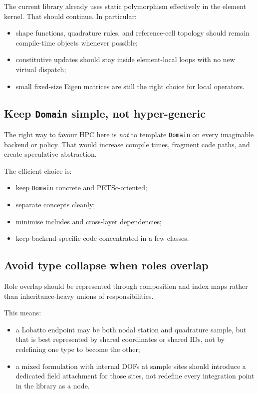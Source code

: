The current library already uses static polymorphism effectively in the element
kernel.  That should continue.  In particular:

\begin{itemize}[nosep]
  \item shape functions, quadrature rules, and reference-cell topology should
        remain compile-time objects whenever possible;
  \item constitutive updates should stay inside element-local loops with no new
        virtual dispatch;
  \item small fixed-size Eigen matrices are still the right choice for local
        operators.
\end{itemize}

\subsection{Keep \texttt{Domain} simple, not hyper-generic}

The right way to favour HPC here is \emph{not} to template \texttt{Domain} on
every imaginable backend or policy.  That would increase compile times,
fragment code paths, and create speculative abstraction.

The efficient choice is:

\begin{itemize}[nosep]
  \item keep \texttt{Domain} concrete and PETSc-oriented;
  \item separate concepts cleanly;
  \item minimise includes and cross-layer dependencies;
  \item keep backend-specific code concentrated in a few classes.
\end{itemize}

\subsection{Avoid type collapse when roles overlap}

Role overlap should be represented through composition and index maps rather
than inheritance-heavy unions of responsibilities.

This means:

\begin{itemize}[nosep]
  \item a Lobatto endpoint may be both nodal station and quadrature sample, but
        that is best represented by shared coordinates or shared IDs, not by
        redefining one type to become the other;
  \item a mixed formulation with internal DOFs at sample sites should introduce
        a dedicated field attachment for those sites, not redefine every
        integration point in the library as a node.
\end{itemize}


